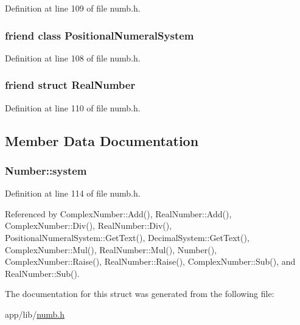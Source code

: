 Definition at line 109 of file numb.\+h.

\subsubsection[{\texorpdfstring{Positional\+Numeral\+System}{PositionalNumeralSystem}}]{\setlength{\rightskip}{0pt plus 5cm}friend class {\bf Positional\+Numeral\+System}\hspace{0.3cm}{\ttfamily [friend]}}\hypertarget{structNumber_aeedc2a5f26536b10c3e3e505e4ddfb81}{}\label{structNumber_aeedc2a5f26536b10c3e3e505e4ddfb81}


Definition at line 108 of file numb.\+h.

\subsubsection[{\texorpdfstring{Real\+Number}{RealNumber}}]{\setlength{\rightskip}{0pt plus 5cm}friend struct {\bf Real\+Number}\hspace{0.3cm}{\ttfamily [friend]}}\hypertarget{structNumber_a405f5c7ef806c4c45a1de7647daa6306}{}\label{structNumber_a405f5c7ef806c4c45a1de7647daa6306}


Definition at line 110 of file numb.\+h.



\subsection{Member Data Documentation}
\subsubsection[{\texorpdfstring{system}{system}}]{ Number\+::system\hspace{0.3cm}{\ttfamily [protected]}}\hypertarget{structNumber_a2ceda5601c42288626e76b06878e7476}{}\label{structNumber_a2ceda5601c42288626e76b06878e7476}


Definition at line 114 of file numb.\+h.



Referenced by Complex\+Number\+::\+Add(), Real\+Number\+::\+Add(), Complex\+Number\+::\+Div(), Real\+Number\+::\+Div(), Positional\+Numeral\+System\+::\+Get\+Text(), Decimal\+System\+::\+Get\+Text(), Complex\+Number\+::\+Mul(), Real\+Number\+::\+Mul(), Number(), Complex\+Number\+::\+Raise(), Real\+Number\+::\+Raise(), Complex\+Number\+::\+Sub(), and Real\+Number\+::\+Sub().



The documentation for this struct was generated from the following file\+:\begin{DoxyCompactItemize}
\item 
app/lib/\hyperlink{numb_8h}{numb.\+h}\end{DoxyCompactItemize}
